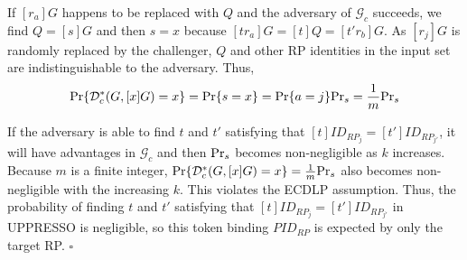 If $[r_a]G$ happens to be replaced with $Q$ and the adversary of $\mathcal{G}_c$ succeeds,
    we find $Q = [s]G$ and then $s=x$ because $[tr_a]G = [t]Q = [t'r_b]G$.
As $[r_j]G$ is randomly replaced by the challenger,
    $Q$ and other RP identities in the input set are indistinguishable to the adversary.
Thus,
\begin{equation*}
{\rm Pr}\{\mathcal{D}^*_c(G, [x]G)=x\} = {\rm Pr}\{s = x\}={\rm Pr}\{a=j\}{\rm Pr}_s=\frac{1}{m}{\rm Pr}_s
\end{equation*}

If the adversary is able to find $t$ and $t'$
    satisfying that $[t]ID_{RP_j} = [t']ID_{RP_{j'}}$,
    it will have advantages in $\mathcal{G}_c$
        and then
         ${\rm Pr}_s$ becomes non-negligible as $k$ increases.
Because $m$ is a finite integer, ${\rm Pr}\{\mathcal{D}^*_c(G, [x]G)=x\} = \frac{1}{m}{\rm Pr}_s$ also
becomes non-negligible with the increasing $k$.
This violates the ECDLP assumption.
Thus, the probability of finding $t$ and $t'$ satisfying that $[t]ID_{RP_j} = [t']ID_{RP_{j'}}$ in UPPRESSO is negligible,
    so this token binding $PID_{RP}$
     is expected by only the target RP.
$\square$





